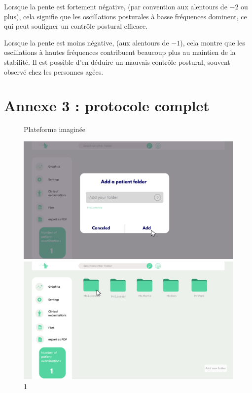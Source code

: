 Lorsque la pente est fortement négative, (par convention aux alentours de $-2$ ou plus), cela signifie que les oscillations posturales à basse fréquences dominent, ce qui peut souligner un contrôle postural efficace.

Lorsque la pente est moins négative, (aux alentours de $-1$), cela montre que les oscillations à hautes fréquences contribuent beaucoup plus au maintien de la stabilité.
Il est possible d'en déduire un mauvais contrôle postural, souvent observé chez les personnes agées.


\newpage
\section{Annexe 3 : protocole complet}

\begin{figure}[H]
    \centering
    \caption{Plateforme imaginée}
    \begin{minipage}{0.3\textwidth}
        \centering
        \includegraphics[width=\textwidth]{images/Prototype/1.png}
        \caption*{1}
    \end{minipage}
    \begin{minipage}{0.3\textwidth}
        \centering
        \includegraphics[width=\textwidth]{images/Prototype/Accueil de la plateforme de visualisation.png}

\end{minipage}
\end{figure}

